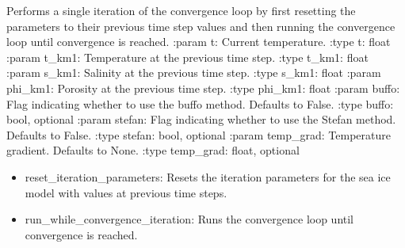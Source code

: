 \documentclass[a4paper,11pt,english,openany]{sphinxmanual}
\begin{document}
\begin{fulllineitems}
\begin{fulllineitems}
\end{fulllineitems}


\begin{fulllineitems}
\label{\detokenize{api/spyice.models.sea_ice_model:src.spyice.models.sea_ice_model.SeaIceModel.convergence_loop_iteration}}
\pysigstartsignatures
\pysiglinewithargsret
{}
{\sphinxparamcomma {}\sphinxparamcomma {}\sphinxparamcomma {}\sphinxparamcomma {}\sphinxparamcomma {}\sphinxparamcomma {}\sphinxparamcomma {}\sphinxparamcomma {}}
{}
\pysigstopsignatures
\sphinxAtStartPar
Performs a single iteration of the convergence loop by first resetting the parameters to their previous time step values and then running the convergence loop until convergence is reached.
:param t: Current temperature.
:type t: float
:param t\_km1: Temperature at the previous time step.
:type t\_km1: float
:param s\_km1: Salinity at the previous time step.
:type s\_km1: float
:param phi\_km1: Porosity at the previous time step.
:type phi\_km1: float
:param buffo: Flag indicating whether to use the buffo method. Defaults to False.
:type buffo: bool, optional
:param stefan: Flag indicating whether to use the Stefan method. Defaults to False.
:type stefan: bool, optional
:param temp\_grad: Temperature gradient. Defaults to None.
:type temp\_grad: float, optional
\begin{description}
\begin{itemize}
\item {} 
\sphinxAtStartPar
reset\_iteration\_parameters: Resets the iteration parameters for the sea ice model with values at previous time steps.

\item {} 
\sphinxAtStartPar
run\_while\_convergence\_iteration: Runs the convergence loop until convergence is reached.


\end{itemize}
\end{description}
\end{fulllineitems}
\end{fulllineitems}
\end{document}
